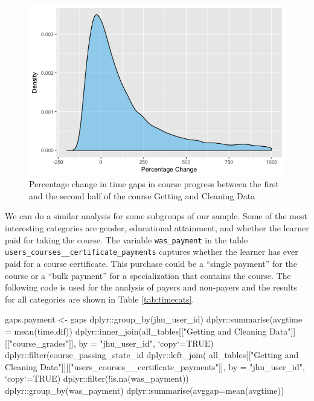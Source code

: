 \begin{figure}[htbp]
    \centering
    \includegraphics[scale=0.5]{timegapchange}
    \caption{Percentage change in time gaps in course progress between the first and the second half of the course Getting and Cleaning Data}
    \label{figure:timegapchange}
\end{figure}

We can do a similar analysis for some subgroups of our sample. Some of
the most interesting categories are gender, educational attainment, and
whether the learner paid for taking the course. The variable
\texttt{was\_payment} in the table
\texttt{users\_courses\_\_certificate\_payments} captures whether the
learner has ever paid for a course certificate. This purchase could be a
``single payment'' for the course or a ``bulk payment'' for a
specialization that contains the course. The following code is used for
the analysis of payers and non-payers and the results for all categories
are shown in Table \ref{tab:timecats}.

\begin{Schunk}
\begin{Sinput}
gaps.payment <- gaps %
    dplyr::group_by(jhu_user_id) %
    dplyr::summarise(avgtime = mean(time.dif)) %
    dplyr::inner_join(all_tables[["Getting and Cleaning Data"]][["course_grades"]],
                      by = "jhu_user_id", `copy`=TRUE) %
    dplyr::filter(course_passing_state_id %
    dplyr::left_join(
        all_tables[["Getting and Cleaning Data"]][["users_courses__certificate_payments"]],
        by = "jhu_user_id", `copy`=TRUE) %
    dplyr::filter(!is.na(was_payment)) %
    dplyr::group_by(was_payment) %
    dplyr::summarise(avggap=mean(avgtime))
\end{Sinput}
\end{Schunk}

